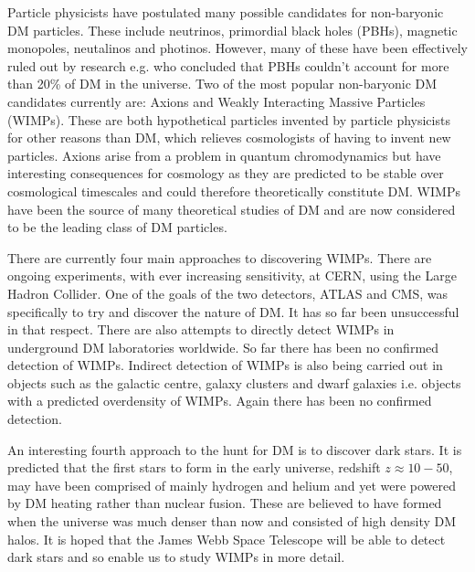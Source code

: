 \documentclass[a4paper,12pt]{article}
\begin{document}
Particle physicists have postulated many possible candidates for non-baryonic DM particles. These include neutrinos, primordial black holes (PBHs), magnetic monopoles, neutalinos and photinos.
However, many of these have been effectively ruled out by research e.g. \cite{gaggero} who concluded that PBHs couldn't account for more than 20\% of DM in the universe.
Two of the most popular non-baryonic DM candidates currently are: Axions and Weakly Interacting Massive Particles (WIMPs). These are both hypothetical particles invented by particle 
physicists for other reasons than DM, which relieves cosmologists of having to invent new particles. Axions arise from a problem in quantum chromodynamics but have interesting 
consequences for cosmology as they are predicted to be stable over cosmological timescales \citep{bertone1} and could therefore theoretically constitute DM. WIMPs have been the source
of many theoretical studies of DM and are now considered to be the leading class of DM particles. 

There are currently four main approaches to discovering WIMPs. There are ongoing experiments, with ever increasing sensitivity, at CERN, using
the Large Hadron Collider. One of the goals of the two detectors, ATLAS and CMS, was specifically to try and discover the nature of DM. It has so far been unsuccessful in that respect.
There are also attempts to directly detect WIMPs in underground DM laboratories worldwide. So far there has been no confirmed detection of WIMPs. Indirect detection of WIMPs is also being
carried out in objects such as the galactic centre, galaxy clusters and dwarf galaxies i.e. objects with a predicted overdensity of WIMPs. Again there has been no confirmed detection.

An interesting fourth approach to the hunt for DM is to discover dark stars. It is predicted that the first stars to form in the early universe, redshift $z\approx 10-50$, may have been 
comprised of mainly hydrogen and helium and yet were powered by DM heating rather than nuclear fusion. These are believed to have formed when the universe was much denser than now and 
consisted of high density DM halos. It is hoped that the James Webb Space Telescope will be able to detect dark stars and so enable us to study WIMPs in more detail.
\end{document}

